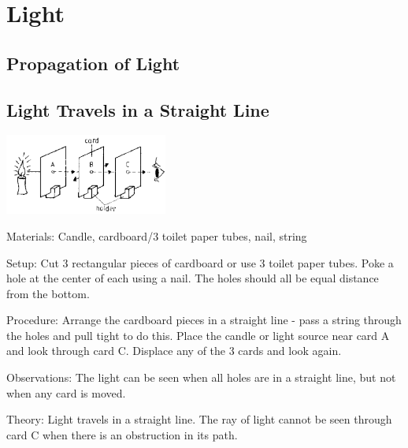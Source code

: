 \section{Light}

\begin{multicols}{2}


\section*{Propagation of Light}


\subsection{Light Travels in a Straight Line}

\begin{center}
\includegraphics[width=0.4\textwidth]{./img/source/prop-of-light.png}
\end{center}

\begin{description*}
\item[Materials:]{Candle, cardboard/3 toilet paper tubes, nail, string}
\item[Setup:]{Cut 3 rectangular pieces of cardboard or use 3 toilet paper tubes. Poke a hole at the center of each using a nail. The holes should all be equal distance from the bottom.}
\item[Procedure:]{Arrange the cardboard pieces in a straight line - pass a string through the holes and pull tight to do this. Place the candle or light source near card A and look through card C. Displace any of the 3 cards and look again.}
\item[Observations:]{The light can be seen when all holes are in a straight line, but not when any card is moved.}
\item[Theory:]{Light travels in a straight line. The ray of light cannot be seen through card C when there is an obstruction in its path.}
\end{description*}


\end{multicols}
